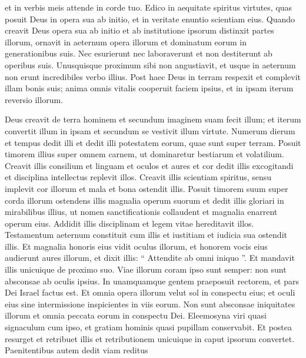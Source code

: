 \begin{biblechapter}
\begin{biblechapter}
\begin{biblechapter}
\begin{biblechapter}
\begin{biblechapter}
\begin{biblechapter}
\begin{biblechapter}
\begin{biblechapter}
\begin{biblechapter}
\begin{biblechapter}
\begin{biblechapter}
\begin{biblechapter}
\begin{biblechapter}
\begin{biblechapter}
\begin{biblechapter}
\begin{biblechapter}
 et in verbis meis attende in corde tuo.
 Edico in aequitate spiritus virtutes,
 quas posuit Deus in opera sua ab initio,
 et in veritate enuntio scientiam eius.
 \verse Quando creavit Deus opera sua ab initio
 et ab institutione ipsorum distinxit partes illorum,
 \verse ornavit in aeternum opera illorum
 et dominatum eorum in generationibus suis.
 Nec esurierunt nec laboraverunt
 et non destiterunt ab operibus suis.
 \verse Unusquisque proximum sibi non angustiavit,
 \verse et usque in aeternum non erunt incredibiles verbo illius.
 \verse Post haec Deus in terram respexit
 et complevit illam bonis suis;
 \verse anima omnis vitalis cooperuit faciem ipsius,
 et in ipsam iterum reversio illorum.
 
\begin{biblechapter}
\verse Deus creavit de terra hominem
 et secundum imaginem suam fecit illum;
 \verse et iterum convertit illum in ipsam
 et secundum se vestivit illum virtute.
 \verse Numerum dierum et tempus dedit illi
 et dedit illi potestatem eorum, quae sunt super terram.
 \verse Posuit timorem illius super omnem carnem,
 ut dominaretur bestiarum et volatilium.
 \verse Creavit illis consilium et linguam et oculos et aures
 et cor dedit illis excogitandi
 et disciplina intellectus replevit illos.
 \verse Creavit illis scientiam spiritus,
 sensu implevit cor illorum
 et mala et bona ostendit illis.
 \verse Posuit timorem suum super corda illorum
 ostendens illis magnalia operum suorum
 \verse et dedit illis gloriari in mirabilibus illius,
 ut nomen sanctificationis collaudent
 et magnalia enarrent operum eius.
 \verse Addidit illis disciplinam
 et legem vitae hereditavit illos.
 \verse Testamentum aeternum constituit cum illis
 et iustitiam et iudicia sua ostendit illis.
 \verse Et magnalia honoris eius vidit oculus illorum,
 et honorem vocis eius audierunt aures illorum,
 et dixit illis: “ Attendite ab omni iniquo ”.
 \verse Et mandavit illis unicuique de proximo suo.
 \verse Viae illorum coram ipso sunt semper:
 non sunt absconsae ab oculis ipsius.
 \verse In unamquamque gentem praeposuit rectorem,
 \verse et pars Dei Israel factus est.
 \verse Et omnia opera illorum velut sol in conspectu eius;
 et oculi eius sine intermissione inspicientes in viis eorum.
 \verse Non sunt absconsae iniquitates illorum
 et omnia peccata eorum in conspectu Dei.
 \verse Eleemosyna viri quasi signaculum cum ipso,
 et gratiam hominis quasi pupillam conservabit.
 \verse Et postea resurget et retribuet illis
 et retributionem unicuique in caput ipsorum convertet.
 \verse Paenitentibus autem dedit viam reditus

\end{biblechapter}
\end{biblechapter}
\end{biblechapter}
\end{biblechapter}
\end{biblechapter}
\end{biblechapter}
\end{biblechapter}
\end{biblechapter}
\end{biblechapter}
\end{biblechapter}
\end{biblechapter}
\end{biblechapter}
\end{biblechapter}
\end{biblechapter}
\end{biblechapter}
\end{biblechapter}
\end{biblechapter}
